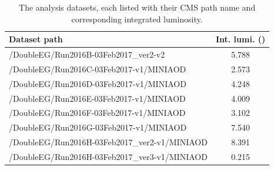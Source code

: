 \begin{table}[!htbp]
	\caption{The analysis datasets, each listed with their CMS path name and corresponding integrated luminosity.}
	\centering
	\vspace{\baselineskip}
	\begin{tabular}{lc}
	\hline \hline
	Dataset path & Int. lumi.  (\fbinv) \\
	\hline
	/DoubleEG/Run2016B-03Feb2017\_ver2-v2          &  5.788 \\
	/DoubleEG/Run2016C-03Feb2017-v1/MINIAOD        &  2.573 \\
	/DoubleEG/Run2016D-03Feb2017-v1/MINIAOD        &  4.248 \\
	/DoubleEG/Run2016E-03Feb2017-v1/MINIAOD        &  4.009 \\
	/DoubleEG/Run2016F-03Feb2017-v1/MINIAOD        &  3.102 \\
	/DoubleEG/Run2016G-03Feb2017-v1/MINIAOD        &  7.540 \\
	/DoubleEG/Run2016H-03Feb2017\_ver2-v1/MINIAOD  &  8.391 \\
	/DoubleEG/Run2016H-03Feb2017\_ver3-v1/MINIAOD  &  0.215 \\
	\hline \hline
	\end{tabular}
	\label{tab:data_samples}
\end{table}


